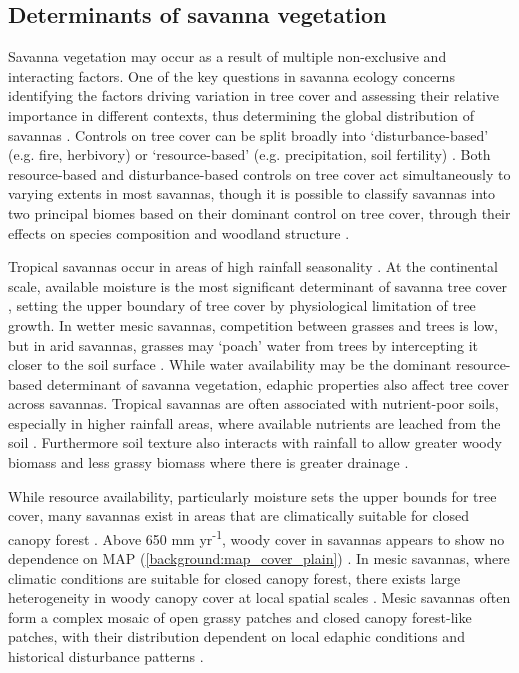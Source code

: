 \begin{refsection}
\subsection{Determinants of savanna vegetation}
\label{background:ssec:determ}

Savanna vegetation may occur as a result of multiple non-exclusive and interacting factors. One of the key questions in savanna ecology concerns identifying the factors driving variation in tree cover and assessing their relative importance in different contexts, thus determining the global distribution of savannas \citep{Higgins2000, Archibald2019}. Controls on tree cover can be split broadly into `disturbance-based' (e.g. fire, herbivory) or `resource-based' (e.g. precipitation, soil fertility)  \citep{Bond2008, Staver2015}. Both resource-based and disturbance-based controls on tree cover act simultaneously to varying extents in most savannas, though it is possible to classify savannas into two principal biomes based on their dominant control on tree cover, through their effects on species composition and woodland structure \citep{Huntley1982, Torello2013}. 

Tropical savannas occur in areas of high rainfall seasonality \citep{Lehmann2011}. At the continental scale, available moisture is the most significant determinant of savanna tree cover \citep{Sankaran2005}, setting the upper boundary of tree cover by physiological limitation of tree growth. In wetter mesic savannas, competition between grasses and trees is low, but in arid savannas, grasses may `poach' water from trees by intercepting it closer to the soil surface \citep{Scheiter2007}. While water availability may be the dominant resource-based determinant of savanna vegetation, edaphic properties also affect tree cover across savannas. Tropical savannas are often associated with nutrient-poor soils, especially in higher rainfall areas, where available nutrients are leached from the soil \citep{February2013}. Furthermore soil texture also interacts with rainfall to allow greater woody biomass and less grassy biomass where there is greater drainage \citep{Staver2011}. 

While resource availability, particularly moisture sets the upper bounds for tree cover, many savannas exist in areas that are climatically suitable for closed canopy forest \citep{Sankaran2005, Lehmann2011, Staver2011, Murphy2012}. Above \textapprox{}650 mm yr\textsuperscript{-1}, woody cover in savannas appears to show no dependence on MAP (\autoref{background:map_cover_plain}) \citep{Sankaran2008, Sankaran2005, Good2011}. In mesic savannas, where climatic conditions are suitable for closed canopy forest, there exists large heterogeneity in woody canopy cover at local spatial scales \citep{Dantas2015}. Mesic savannas often form a complex mosaic of open grassy patches and closed canopy forest-like patches, with their distribution dependent on local edaphic conditions and historical disturbance patterns \citep{Staver2011}. 


\end{refsection}
